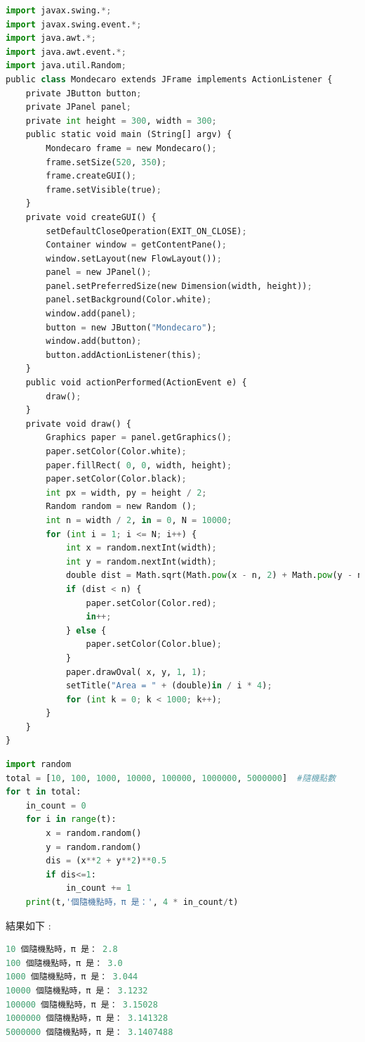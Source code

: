 \documentclass[10pt,UTF8]{ctexart}
\begin{document}
\begin{lstlisting}[language={python}]
import javax.swing.*;
import javax.swing.event.*;
import java.awt.*;
import java.awt.event.*;
import java.util.Random;
public class Mondecaro extends JFrame implements ActionListener {
    private JButton button;
    private JPanel panel;
    private int height = 300, width = 300;
    public static void main (String[] argv) {
        Mondecaro frame = new Mondecaro();
        frame.setSize(520, 350);
        frame.createGUI();
        frame.setVisible(true);
    }
    private void createGUI() {
        setDefaultCloseOperation(EXIT_ON_CLOSE);
        Container window = getContentPane();
        window.setLayout(new FlowLayout());
        panel = new JPanel();
        panel.setPreferredSize(new Dimension(width, height));
        panel.setBackground(Color.white);
        window.add(panel);
        button = new JButton("Mondecaro");
        window.add(button);
        button.addActionListener(this);
    }
    public void actionPerformed(ActionEvent e) {
        draw();
    }
    private void draw() {
        Graphics paper = panel.getGraphics();
        paper.setColor(Color.white);
        paper.fillRect( 0, 0, width, height);
        paper.setColor(Color.black);
        int px = width, py = height / 2;
        Random random = new Random ();
        int n = width / 2, in = 0, N = 10000;
        for (int i = 1; i <= N; i++) {
            int x = random.nextInt(width);
            int y = random.nextInt(width);
            double dist = Math.sqrt(Math.pow(x - n, 2) + Math.pow(y - n, 2));
            if (dist < n) {
                paper.setColor(Color.red);
                in++;
            } else {
                paper.setColor(Color.blue);
            }
            paper.drawOval( x, y, 1, 1);
            setTitle("Area = " + (double)in / i * 4);
            for (int k = 0; k < 1000; k++); 
        }
    }
}
\end{lstlisting}

\begin{lstlisting}[language={python}]
import random
total = [10, 100, 1000, 10000, 100000, 1000000, 5000000]  #隨機點數
for t in total:
    in_count = 0
    for i in range(t):
        x = random.random()
        y = random.random()
        dis = (x**2 + y**2)**0.5
        if dis<=1:
            in_count += 1
    print(t,'個隨機點時，π 是：', 4 * in_count/t)
\end{lstlisting}

結果如下 :

\begin{lstlisting}[language={python}]
10 個隨機點時，π 是： 2.8
100 個隨機點時，π 是： 3.0
1000 個隨機點時，π 是： 3.044
10000 個隨機點時，π 是： 3.1232
100000 個隨機點時，π 是： 3.15028
1000000 個隨機點時，π 是： 3.141328
5000000 個隨機點時，π 是： 3.1407488
\end{lstlisting}
\end{document}
